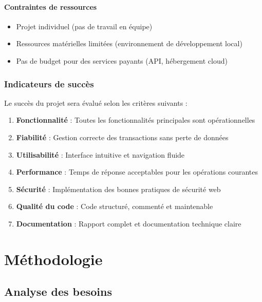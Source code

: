 \documentclass[12pt,a4paper]{report}
\begin{document}
\subsubsection{Contraintes de ressources}

\begin{itemize}
    \item Projet individuel (pas de travail en équipe)
    \item Ressources matérielles limitées (environnement de développement local)
    \item Pas de budget pour des services payants (API, hébergement cloud)
\end{itemize}

\subsection{Indicateurs de succès}

Le succès du projet sera évalué selon les critères suivants :

\begin{enumerate}
    \item \textbf{Fonctionnalité} : Toutes les fonctionnalités principales sont opérationnelles
    \item \textbf{Fiabilité} : Gestion correcte des transactions sans perte de données
    \item \textbf{Utilisabilité} : Interface intuitive et navigation fluide
    \item \textbf{Performance} : Temps de réponse acceptables pour les opérations courantes
    \item \textbf{Sécurité} : Implémentation des bonnes pratiques de sécurité web
    \item \textbf{Qualité du code} : Code structuré, commenté et maintenable
    \item \textbf{Documentation} : Rapport complet et documentation technique claire
\end{enumerate}

\clearpage



\chapter{Méthodologie}

\section{Analyse des besoins}
\end{document}

